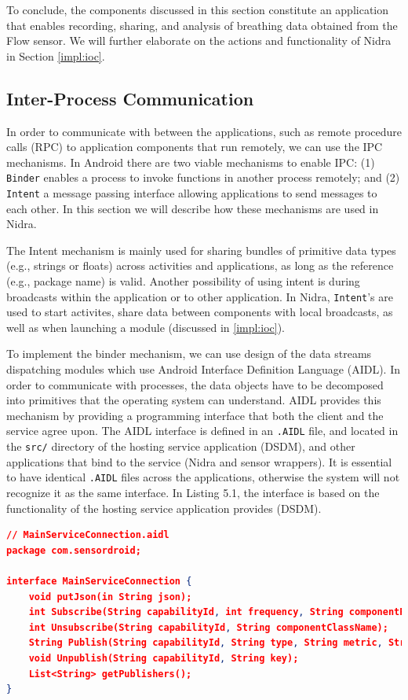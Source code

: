 
To conclude, the components discussed in this section constitute an application that enables recording, sharing, and analysis of breathing data obtained from the Flow sensor. We will further elaborate on the actions and functionality of Nidra in Section \ref{impl:ioc}.  


\subsection{Inter-Process Communication}\label{implement:aidl}
In order to communicate with between the applications, such as remote procedure calls (RPC) to application components that run remotely, we can use the IPC mechanisms. In Android there are two viable mechanisms to enable IPC: (1) \verb|Binder| enables a process to invoke functions in another process remotely; and (2) \verb|Intent| a message passing interface allowing applications to send messages to each other. In this section we will describe how these mechanisms are used in Nidra.

The Intent mechanism is mainly used for sharing bundles of primitive data types (e.g., strings or floats) across activities and applications, as long as the reference (e.g., package name) is valid. Another possibility of using intent is during broadcasts within the application or to other application. In Nidra, \verb|Intent|'s are used to start activites, share data between components with local broadcasts, as well as when launching a module (discussed in \ref{impl:ioc}).

To implement the binder mechanism, we can use design of the data streams dispatching modules which use Android Interface Definition Language (AIDL). In order to communicate with processes, the data objects have to be decomposed into primitives that the operating system can understand. AIDL provides this mechanism by providing a programming interface that both the client and the service agree upon. The AIDL interface is defined in an \verb|.AIDL| file, and located in the \verb|src/| directory of the hosting service application (DSDM), and other applications that bind to the service (Nidra and sensor wrappers). It is essential to have identical \verb|.AIDL| files across the applications, otherwise the system will not recognize it as the same interface. In Listing 5.1, the interface is based on the functionality of the hosting service application provides (DSDM). 

\begin{lstlisting}[language=json, caption={My Caption}, captionpos=b]
// MainServiceConnection.aidl
package com.sensordroid;

interface MainServiceConnection {
    void putJson(in String json);
    int Subscribe(String capabilityId, int frequency, String componentPackageName, String componentClassName);
    int Unsubscribe(String capabilityId, String componentClassName);
    String Publish(String capabilityId, String type, String metric, String description);
    void Unpublish(String capabilityId, String key);
    List<String> getPublishers();
}
\end{lstlisting}


